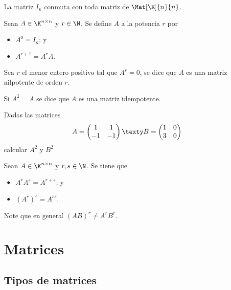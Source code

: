 \documentclass[compacto,10pt]{pubciencias-notas}
\begin{document}
\begin{obs}
La matriz $I_{n}$ conmuta con toda matriz de $\Mat[\K]{n}{n}$.
\end{obs}

\begin{defi}
    Sean $A \in \K^{n \times n}$ y $r\in\N$. Se define $A$ a la potencia $r$ por
    \begin{itemize}
    \item[$a)$] 
        $A^0 = I_n$; y
    \item[$b)$] 
        $A^{r+1} = A^rA$.
    \end{itemize}
\end{defi}
\begin{obs}
    Sea $r$ el menor entero positivo tal que $A^r=0$, se dice que $A$ es una matriz nilpotente de orden $r$. 
\end{obs}
\begin{obs}
    Si $A^2=A$ se dice que $A$ es una  matriz idempotente. 
\end{obs}

\begin{ejer}
    Dadas las matrices
    \[
        A=\begin{pmatrix}1&1\\-1&-1\end{pmatrix}  \texty  B=\begin{pmatrix}1&0\\3&0\end{pmatrix}
    \]
    calcular $A^2$ y $B^2$
\end{ejer}

\begin{teo}\label{Apunte01TeoPot}
    Sean $A \in \K^{n \times n}$ y $r,s\in\N$. Se tiene que
    \begin{itemize}
    \item[$a)$] 
        $A^r A^s = A^{r+s}$; y 
    \item[$b)$] 
        $(A^r)^s = A^{rs}$.
    \end{itemize}
\end{teo}

\begin{advertencia}
Note que en general $(AB)^r \neq A^r B^r$.
\end{advertencia}

\section{Matrices}
\setcounter{subsection}{2}
\subsection{Tipos de matrices}
\end{document}
